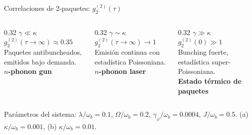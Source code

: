 \documentclass[
11pt,notheorems,hyperref={pdfauthor=whatever}
]{beamer}
\begin{document}
\begin{frame}{Correlaciones de 2-paquetes: $g_2^{(2)}(\tau)$}
	
	\vspace{-25pt}
	
	\begin{center}
		\resizebox{0.85\textwidth}{!}{%
		}
	\end{center}
	
	\begin{columns}[T]
		\begin{column}{0.32\textwidth}
			{\small
				$\gamma \ll \kappa$\\
				$g_2^{(2)}(\tau\to\infty) \approx 0.35$\\[6pt]
				Paquetes antibuncheados,
				emitidos bajo demanda.\\
				\textbf{$n$-phonon gun}
			}
		\end{column}
		\begin{column}{0.32\textwidth}
			{\small
				$\gamma \sim \kappa$\\
				$g_2^{(2)}(\tau\to\infty) \to 1$\\
				Emisión continua con
				estadística Poissoniana.\\
				\textbf{$n$-phonon laser}
			}
		\end{column}
		\begin{column}{0.32\textwidth}
			{\small
				$\gamma \gg \kappa$\\
				$g_2^{(2)}(0) \gg 1$\\
				Bunching fuerte,
				estadística super-Poissoniana.\\
				\textbf{Estado térmico de paquetes}
			}
		\end{column}
	\end{columns}
	
	\vspace{10pt}
	{\scriptsize
		Parámetros del sistema: $\lambda/\omega_b=0.1$, $\Omega/\omega_b=0.2$,
		$\gamma_\varphi/\omega_b=0.0004$, $J/\omega_b=0.5$.
		(a) $\kappa/\omega_b=0.001$, (b) $\kappa/\omega_b=0.01$.
	}
	
\end{frame}
\end{document}
